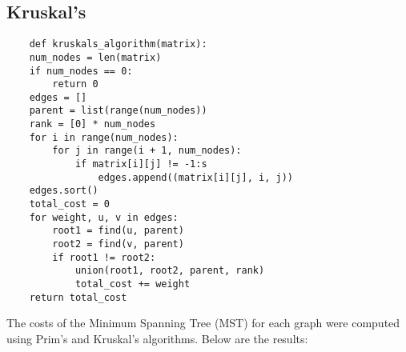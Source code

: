 \documentclass{article}
\begin{document}
\subsection*{Kruskal’s}
\begin{verbatim}
    def kruskals_algorithm(matrix):
    num_nodes = len(matrix)
    if num_nodes == 0:
        return 0
    edges = []
    parent = list(range(num_nodes))
    rank = [0] * num_nodes
    for i in range(num_nodes):
        for j in range(i + 1, num_nodes):
            if matrix[i][j] != -1:s
                edges.append((matrix[i][j], i, j))
    edges.sort()
    total_cost = 0
    for weight, u, v in edges:
        root1 = find(u, parent)
        root2 = find(v, parent)
        if root1 != root2:
            union(root1, root2, parent, rank)
            total_cost += weight
    return total_cost
\end{verbatim}
The costs of the Minimum Spanning Tree (MST) for each graph were computed using Prim's and Kruskal's algorithms. Below are the results:
\end{document}

